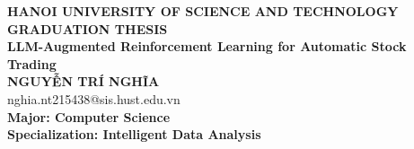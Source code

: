 \begin{titlepage}
  \thispagestyle{empty}
  \begin{center}

    {\textbf{\large{HANOI UNIVERSITY OF SCIENCE AND TECHNOLOGY}}}\\[4cm]

    {\textbf{\huge{ GRADUATION THESIS}}}\\[1cm]
    {\textbf{\Large{LLM-Augmented Reinforcement Learning for Automatic Stock Trading}}}\\[1cm]

    {\textbf{\large{NGUYỄN TRÍ NGHĨA}}}\\
    {\large{nghia.nt215438@sis.hust.edu.vn}}\\[0.5cm]

    {\textbf{\large{Major: Computer Science}}}\\
    {\textbf{\large{Specialization: Intelligent Data Analysis}}}\\

    \vspace{2cm}

    \begin{table}[H]
      \centering
      \large
    \end{table}
  \end{center}
\end{titlepage}
